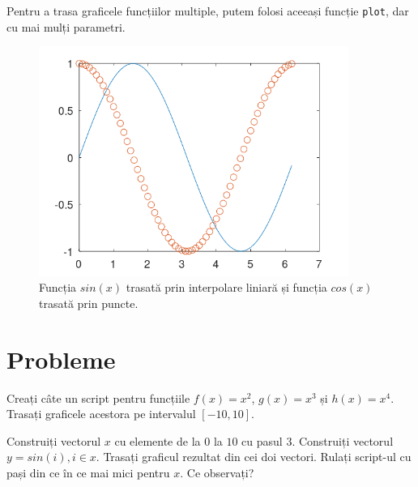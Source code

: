 \documentclass{exam}
\newcommand{\octavescript}[2]{
	
}
\begin{document}
\newpage
\par Pentru a trasa graficele funcțiilor multiple, putem folosi aceeași funcție
\verb|plot|, dar cu mai mulți parametri.

\octavescript{./src/plot2.m}{}

\begin{figure}[ht]
	\centering
	\includegraphics[width=0.9\textwidth]{plot2}
	\caption{Funcția $sin(x)$ trasată prin interpolare liniară și funcția $cos(x)$ trasată prin puncte.}
\end{figure}

\section{Probleme}

\begin{questions}
	\boxedpoints
	\pointsinmargin

	\question Creați câte un script pentru funcțiile $f(x) = x^2$, $g(x) = x^3$
	și $h(x) = x^4$.
	Trasați graficele acestora pe intervalul $[-10, 10]$.

	\question Construiți vectorul $x$ cu elemente de la $0$ la $10$ cu pasul $3$.
	Construiți vectorul $y = sin(i), i \in x$. Trasați graficul rezultat din cei
	doi vectori. Rulați script-ul cu pași din ce în ce mai mici pentru $x$. Ce
	observați?
\end{questions}
\end{document}
